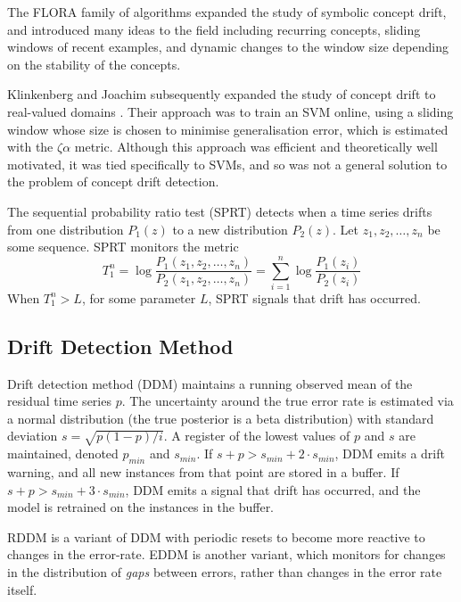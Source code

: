 The FLORA family of algorithms  \cite{FLORA}\cite{FLORA2}\cite{FLORA3} expanded the study of symbolic concept drift, and introduced many ideas to the field including recurring concepts, sliding windows of recent examples, and dynamic changes to the window size depending on the stability of the concepts. 

Klinkenberg and Joachim subsequently expanded the study of concept drift to real-valued domains \cite{SVM_detection}. Their approach was to train an SVM online, using a sliding window whose size is chosen to minimise generalisation error, which is estimated with the $\zeta\alpha$ metric. Although this approach was efficient and theoretically well motivated, it was tied specifically to SVMs, and so was not a general solution to the problem of concept drift detection.

The sequential probability ratio test (SPRT) \cite{SPRT} detects when a time series drifts from one distribution $P_1(z)$ to a new distribution $P_2(z)$. Let $z_1,z_2,\dots,z_n$ be some sequence. SPRT monitors the metric
\begin{equation}
  T_1^n = \log\frac{P_1(z_1,z_2,\dots,z_n)}{P_2(z_1,z_2,\dots,z_n)} = \sum_{i=1}^n \log\frac{P_1(z_i)}{P_2(z_i)}
\end{equation}
When $T_1^n>L$, for some parameter $L$, SPRT signals that drift has occurred.

\subsection{Drift Detection Method}

Drift detection method (DDM) \cite{DDM} maintains a running observed mean of the residual time series $p$. The uncertainty around the true error rate is estimated via a normal distribution (the true posterior is a beta distribution) with standard deviation $s=\sqrt{p(1-p)/i}$. A register of the lowest values of $p$ and $s$ are maintained, denoted $p_{min}$ and $s_{min}$. If $s+p>s_{min}+2\cdot s_{min}$, DDM emits a drift warning, and all new instances from that point are stored in a buffer. If $s+p>s_{min}+3\cdot s_{min}$, DDM emits a signal that drift has occurred, and the model is retrained on the instances in the buffer. 

RDDM \cite{RDDM} is a variant of DDM with periodic resets to become more reactive to changes in the error-rate. EDDM \cite{EDDM} is another variant, which monitors for changes in the distribution of {\it gaps} between errors, rather than changes in the error rate itself.

